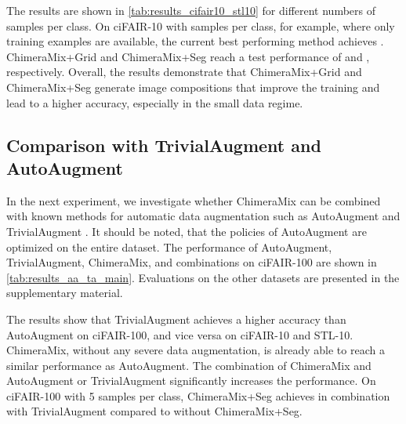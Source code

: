 \documentclass{article}
\newcommand{\methodname}{ChimeraMix\xspace}
\newcommand{\methodnamegrid}{ChimeraMix+Grid\xspace}
\newcommand{\methodnameseg}{ChimeraMix+Seg\xspace}
\newcommand{\cifairX}{ciFAIR-10\xspace}
\newcommand{\cifairC}{ciFAIR-100\xspace}
\newcommand{\stl}{STL-10\xspace}
\begin{document}
The results are shown in \cref{tab:results_cifair10_stl10} for different numbers of samples per class.
On \cifairX with  samples per class, for example, where only  training examples are available, the current best performing method achieves . 
\methodnamegrid and \methodnameseg reach a test performance of  and , respectively.
Overall, the results demonstrate that \methodnamegrid and \methodnameseg generate image compositions that improve the training and lead to a higher accuracy, especially in the small data regime.

\subsection{Comparison with TrivialAugment and AutoAugment}

In the next experiment, we investigate whether \methodname can be combined with known methods for automatic data augmentation such as AutoAugment \cite{cubukAutoAugmentLearningAugmentation2019} and TrivialAugment \cite{mullerTrivialAugmentTuningfreeStateoftheArt2021}.
It should be noted, that the policies of AutoAugment are optimized on the entire dataset.
The performance of AutoAugment, TrivialAugment, \methodname, and combinations on \cifairC are shown in \cref{tab:results_aa_ta_main}. 
Evaluations on the other datasets are presented in the supplementary material. 

The results show that TrivialAugment achieves a higher accuracy than AutoAugment on \cifairC, and vice versa on \cifairX and \stl.
\methodname, without any severe data augmentation, is already able to reach a similar performance as AutoAugment.
The combination of \methodname and AutoAugment or TrivialAugment significantly increases the performance. 
On \cifairC with 5 samples per class, \methodnameseg achieves  in combination with TrivialAugment compared to  without \methodnameseg.
\end{document}
